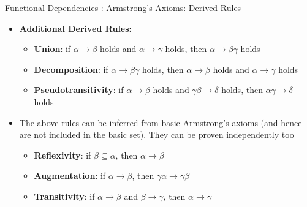 \documentclass[aspectratio=169, xcolor=dvipsnames]{beamer}
\begin{document}
\begin{frame}{Functional Dependencies : Armstrong's Axioms: Derived Rules}
    \begin{itemize}[<+->]
        \item \textbf{Additional Derived Rules:}
        \begin{itemize}
            \item[$\triangleright$] \textbf{Union}: if $\alpha \rightarrow \beta$ holds and $\alpha \rightarrow \gamma$ holds, then $\alpha \rightarrow \beta\gamma$ holds
            \item[$\triangleright$] \textbf{Decomposition}: if $\alpha \rightarrow \beta\gamma$ holds, then $\alpha \rightarrow \beta$ holds and $\alpha \rightarrow \gamma$ holds
            \item[$\triangleright$] \textbf{Pseudotransitivity}: if $\alpha \rightarrow \beta$ holds and $\gamma\beta \rightarrow \delta$ holds, then $\alpha\gamma \rightarrow \delta$ holds
        \end{itemize}
        \item The above rules can be inferred from basic Armstrong's axioms (and hence are not included in the basic set). They can be proven independently too
        \begin{itemize}
            \item[$\triangleright$] \textbf{Reflexivity}: if $\beta \subseteq \alpha$, then $\alpha \rightarrow \beta$
            \item[$\triangleright$] \textbf{Augmentation}: if $\alpha \rightarrow \beta$, then $\gamma\alpha \rightarrow \gamma\beta$
            \item[$\triangleright$] \textbf{Transitivity}: if $\alpha \rightarrow \beta$ and $\beta \rightarrow \gamma$, then $\alpha \rightarrow \gamma$
        \end{itemize}
    \end{itemize}
\end{frame}
\end{document}
